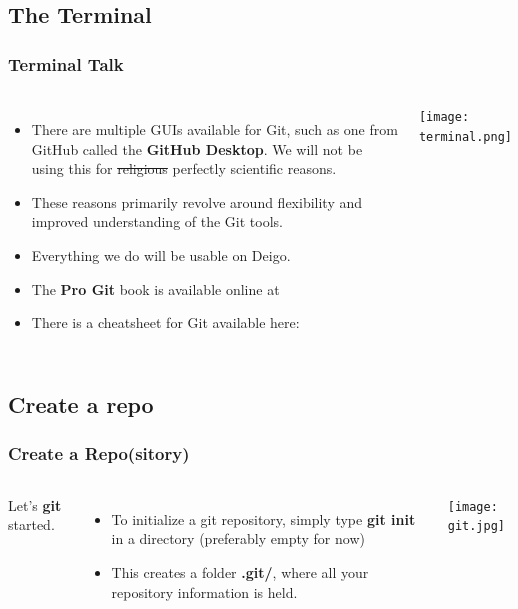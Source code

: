 \documentclass{beamer}
\begin{document}
\subsection{The Terminal}

\begin{frame}[fragile]
\frametitle{Terminal Talk}
\begin{columns}
\begin{itemize}
\item There are multiple GUIs available for Git, such as one from GitHub called the \textbf{GitHub Desktop}. We will not be using this for \sout{religious} perfectly scientific reasons.
\item These reasons primarily revolve around flexibility and improved understanding of the Git tools.
\item Everything we do will be usable on Deigo.
\item The \textbf{Pro Git} book is available online at \href{https://git-scm.com/book/}{\textbf{\color{blue}{git-scm.com/book}}}
\item There is a cheatsheet for Git available here: \href{https://www.git-tower.com/learn/cheat-sheets/git}{\textbf{\color{blue}{https://www.git-tower.com/learn/cheat-sheets/git}}}
\end{itemize}
\texttt{[image: terminal.png]}
\end{columns}
\end{frame}

\subsection{Create a repo}

\begin{frame}[fragile]
\frametitle{Create a Repo(sitory)}
\begin{columns}
Let's \textbf{git} started.
\begin{itemize}
\item To initialize a git repository, simply type \textbf{git init} in a directory (preferably empty for now)
\item This creates a folder \textbf{.git/}, where all your repository information is held.
\end{itemize}
\texttt{[image: git.jpg]}
\end{columns}
\end{frame}
\end{document}

